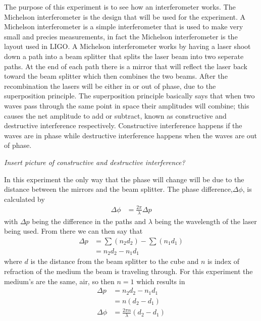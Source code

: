 	The purpose of this experiment is to see how an interferometer works. The Michelson interferometer is the design that 
will be used for the experiment. A Michelson interferometer is a simple interferometer that is used to make very small and precies
measurements, in fact the Michelson interferometer is the layout used in LIGO. A Michelson interferometer works by having a laser 
shoot down a path into a beam splitter that splits the laser beam into two seperate paths. At the end of each path there is a mirror
that will reflect the laser back toward the beam splitter which then combines the two beams. After the recombination the lasers 
will be either in or out of phase, due to the superposition principle. The superposition principle basically says that when two waves
pass through the same point in space their amplitudes will combine; this causes the net amplitude to add or subtract, known as
constructive and destructive interference respectively. Constructive interference happens if the waves are in phase while destructive 
interference happens when the waves are out of phase.

\emph{Insert picture of constructive and destructive interference?}

	In this experiment the only way that the phase will change will be due to the distance between the mirrors and the beam splitter.
The phase difference,$\Delta \phi$, is calculated by 
	\begin{align}
		\nonumber \Delta \phi &=\frac{2\pi}{\lambda} \Delta p
	\end{align}
with $\Delta p$ being the difference in the paths and $\lambda$ being the wavelength of the laser being used. From there we can then say that 
	\begin{align}
		\nonumber \Delta p &=\sum(n_2 d_2)-\sum(n_1 d_1) \\
		\nonumber		&=n_2 d_2 - n_1 d_1
	\end{align} 
where $d$ is the distance from the beam splitter to the cube
and $n$ is index of refraction of the medium the beam is 
traveling through. For this experiment the medium's are the 
same, air, so then $n=1$ which results in
	\begin{align}
		\nonumber \Delta p &= n_2 d_2 - n_1 d_1 \\
		\nonumber 	&= n(d_2 - d_1) \\
		\nonumber \Delta \phi &=\frac{2\pi n}{\lambda} (d_2 - d_1)
	\end{align}

	
